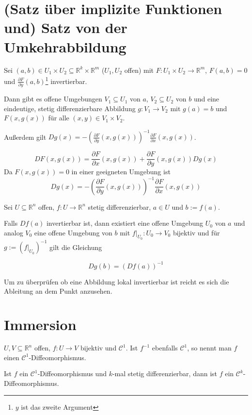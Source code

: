 \section{(Satz \"uber implizite Funktionen und) Satz von der Umkehrabbildung}
\begin{theorem}
	Sei $(a,b) \in U_1 \times U_2 \subseteq \mathbb R^k \times \mathbb R^m$ ($U_1, U_2$ offen) mit $F: U_1 \times U_2 \rightarrow \mathbb R^m$, $F(a,b) = 0$ und $\frac{\partial F}{\partial y}(a,b)$\footnote{$y$ ist das zweite Argument} invertierbar.
	
	Dann gibt es offene Umgebungen $V_1\subseteq U_1$ von $a$, $V_2\subseteq U_2$ von $b$ und eine eindeutige, stetig differenzierbare Abbildung $g:V_1 \rightarrow V_2$ mit $g(a)=b$ und $F(x,g(x))$ f\"ur alle $(x,y)\in V_1\times V_2$.
	
	Au\ss erdem gilt $Dg(x) = -\left(\frac{\partial F}{\partial y}(x,g(x)) \right)^{-1}\frac{\partial F}{\partial x}(x,g(x))$.
\end{theorem}
\begin{remark}[Merkhilfe]
	$$DF(x,g(x)) = \frac{\partial F}{\partial x}(x,g(x)) + \frac{\partial F}{\partial y}(x,g(x)) Dg(x)$$
	Da $F(x,g(x))=0$ in einer geeigneten Umgebung ist $$Dg(x)=-\left(\frac{\partial F}{\partial y}(x,g(x)) \right)^{-1}\frac{\partial F}{\partial x}(x,g(x))$$
\end{remark}

\begin{theorem}
	Sei $U \subseteq \mathbb R^n$ offen, $f: U \rightarrow \mathbb R^n$ stetig differenzierbar, $a\in U$ und $b:=f(a)$.
	
	Falls $Df(a)$ invertierbar ist, dann existiert eine offene Umgebung $U_0$ von $a$ und analog $V_0$ eine offene Umgebung von $b$ mit $f|_{U_0}: U_0 \rightarrow V_0$ bijektiv und f\"ur $g:=\left(f|_{U_0} \right)^{-1}$ gilt die Gleichung
	
	$$Dg(b)=(Df(a))^{-1}$$
\end{theorem}
\begin{remark}
	Um zu \"uberpr\"ufen ob eine Abbildung lokal invertierbar ist reicht es sich die Ableitung an dem Punkt anzusehen.
\end{remark}




\section{Immersion}
\begin{definition}[Diffeomorphismus]
	$U, V\subseteq \mathbb R^n$ offen, $f:U \rightarrow V$ bijektiv und $\mathcal C^1$. Ist $f^{-1}$ ebenfalls $\mathcal C^1$, so nennt man $f$ einen $\mathcal C^1$-Diffeomorphismus.
\end{definition}
\begin{lemma}
	Ist $f$ ein $\mathcal C^1$-Diffeomorphismus und $k$-mal stetig differenzierbar, dann ist $f$ ein $\mathcal C^k$-Diffeomorphismus.
\end{lemma}

